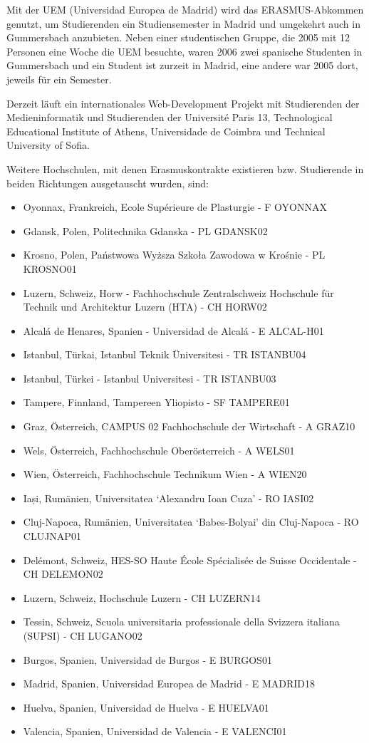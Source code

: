 Mit der UEM (Universidad Europea de Madrid) wird das ERASMUS-Abkommen
genutzt, um Studierenden ein Studiensemester in Madrid und umgekehrt
auch in Gummersbach anzubieten. Neben einer studentischen Gruppe, die
2005 mit 12 Personen eine Woche die UEM besuchte, waren 2006 zwei
spanische Studenten in Gummersbach und ein Student ist zurzeit in
Madrid, eine andere war 2005 dort, jeweils für ein Semester.

Derzeit läuft ein internationales Web-Development Projekt mit
Studierenden der Medieninformatik und Studierenden der Université Paris
13, Technological Educational Institute of Athens, Universidade de
Coimbra und Technical University of Sofia.

Weitere Hochschulen, mit denen Erasmuskontrakte existieren bzw.
Studierende in beiden Richtungen ausgetauscht wurden, sind:

\begin{itemize}
\tightlist
\item
  Oyonnax, Frankreich, Ecole Supérieure de Plasturgie - F OYONNAX
\item
  Gdansk, Polen, Politechnika Gdanska - PL GDANSK02
\item
  Krosno, Polen, Państwowa Wyższa Szkoła Zawodowa w Krośnie - PL
  KROSNO01
\item
  Luzern, Schweiz, Horw - Fachhochschule Zentralschweiz Hochschule für
  Technik und Architektur Luzern (HTA) - CH HORW02
\item
  Alcalá de Henares, Spanien - Universidad de Alcalá - E ALCAL-H01
\item
  Istanbul, Türkai, Istanbul Teknik Üniversitesi - TR ISTANBU04
\item
  Istanbul, Türkei - Istanbul Universitesi - TR ISTANBU03
\item
  Tampere, Finnland, Tampereen Yliopisto - SF TAMPERE01
\item
  Graz, Österreich, CAMPUS 02 Fachhochschule der Wirtschaft - A GRAZ10
\item
  Wels, Österreich, Fachhochschule Oberösterreich - A WELS01
\item
  Wien, Österreich, Fachhochschule Technikum Wien - A WIEN20
\item
  Iași, Rumänien, Universitatea `Alexandru Ioan Cuza' - RO IASI02
\item
  Cluj-Napoca, Rumänien, Universitatea `Babes-Bolyai' din Cluj-Napoca -
  RO CLUJNAP01
\item
  Delémont, Schweiz, HES-SO Haute École Spécialisée de Suisse
  Occidentale - CH DELEMON02
\item
  Luzern, Schweiz, Hochschule Luzern - CH LUZERN14
\item
  Tessin, Schweiz, Scuola universitaria professionale della Svizzera
  italiana (SUPSI) - CH LUGANO02
\item
  Burgos, Spanien, Universidad de Burgos - E BURGOS01
\item
  Madrid, Spanien, Universidad Europea de Madrid - E MADRID18
\item
  Huelva, Spanien, Universidad de Huelva - E HUELVA01
\item
  Valencia, Spanien, Universidad de Valencia - E VALENCI01
\end{itemize}

